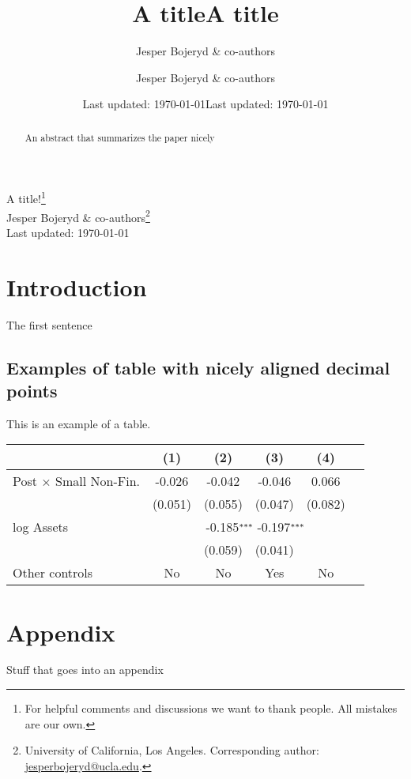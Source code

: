 \documentclass[12pt,letter]{article}
\title{A title}
\date{Last updated: \today}
\author{Jesper Bojeryd \& co-authors}
\title{A title}
\date{Last updated: \today}
\author{Jesper Bojeryd \& co-authors}
\def\sym#1{\ensuremath{^{\mathrlap{#1}}}}
\begin{document}
 
\begingroup 
\renewcommand{\thefootnote}{\fnsymbol{footnote}}
  \centering 
  \LARGE A title!\footnote{For helpful comments and discussions we want to thank people. All mistakes are our own.} \\[0.2em]
  \large Jesper Bojeryd \& co-authors\footnote{University of California, Los Angeles. Corresponding author: \url{jesperbojeryd@ucla.edu}.}\\[0.5em]
  Last updated: \today
  \\[1em]\par
\endgroup

\setcounter{footnote}{0}%

\begin{abstract}
    \noindent An abstract that summarizes the paper nicely
\end{abstract}

\section{Introduction}
The first sentence

\subsection{Examples of table with nicely aligned decimal points}
This is an example of a table.

\begin{table}[h]\centering
{}
    \begin{tabular}{lSSSSS}
    \hline
                        & {(1)} & {(2)} & {(3)} & {(4)} \\
    \hline
    {Post $\times$ Small Non-Fin.} & -0.026 & -0.042 & -0.046 & 0.066 \\
                        & {(}0.051{)} & {(}0.055{)} & {(}0.047{) }& {(}0.082{)} \\
    {log Assets} & & -0.185\sym{***}& -0.197\sym{***}&  \\
                        & & {(}0.059{)} & {(}0.041{)} & \\
    {Other controls} & {No} & {No} & {Yes} & {No} \\
    \hline
    \end{tabular}
\end{table}





\newpage\clearpage
\appendix 
\setcounter{figure}{0} \renewcommand{\thefigure}{A\arabic{figure}}
\setcounter{table}{0} \renewcommand{\thetable}{A\arabic{table}}

\section*{Appendix}
Stuff that goes into an appendix
\end{document}
